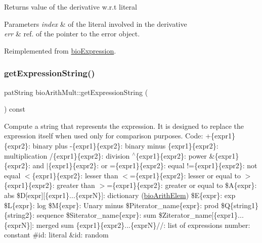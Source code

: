\begin{DoxyReturn}{Returns}
value of the derivative w.\+r.\+t literal 
\end{DoxyReturn}

\begin{DoxyParams}{Parameters}
{\em index} & of the literal involved in the derivative \\
\hline
{\em err} & ref. of the pointer to the error object. \\
\hline
\end{DoxyParams}


Reimplemented from \hyperlink{classbio_expression_a5915579d1193f25f216c1e273c97f2ce}{bio\+Expression}.

\mbox{\label{classbio_arith_mult_a7a19012c1cfe783b75de9a9c961587c2}} 
\subsubsection{\texorpdfstring{get\+Expression\+String()}{getExpressionString()}}
{\footnotesize\ttfamily pat\+String bio\+Arith\+Mult\+::get\+Expression\+String (\begin{DoxyParamCaption}{ }\end{DoxyParamCaption}) const\hspace{0.3cm}{\ttfamily [virtual]}}

Compute a string that represents the expression. It is designed to replace the expression itself when used only for comparison purposes. Code\+: +\{expr1\}\{expr2\}\+: binary plus -\/\{expr1\}\{expr2\}\+: binary minus \{expr1\}\{expr2\}\+: multiplication /\{expr1\}\{expr2\}\+: division $^\wedge$\{expr1\}\{expr2\}\+: power \&\{expr1\}\{expr2\}\+: and $\vert$\{expr1\}\{expr2\}\+: or =\{expr1\}\{expr2\}\+: equal !=\{expr1\}\{expr2\}\+: not equal $<$\{expr1\}\{expr2\}\+: lesser than $<$=\{expr1\}\{expr2\}\+: lesser or equal to $>$\{expr1\}\{expr2\}\+: greater than $>$=\{expr1\}\{expr2\}\+: greater or equal to \$A\{expr\}\+: abs \$D\mbox{[}expr\mbox{]}\mbox{[}\{expr1\}...\{exprN\}\mbox{]}\+: dictionary (\hyperlink{classbio_arith_elem}{bio\+Arith\+Elem}) \$E\{expr\}\+: exp \$L\{expr\}\+: log \$M\{expr\}\+: Unary minus \$\+Piterator\+\_\+name\{expr\}\+: prod \$Q\{string1\}\{string2\}\+: sequence \$\+Siterator\+\_\+name\{expr\}\+: sum \$\+Ziterator\+\_\+name\mbox{[}\{expr1\}...\{exprN\}\mbox{]}\+: merged sum \{expr1\}\{expr2\}...\{exprN\}//\+: list of expressions number\+: constant \#id\+: literal \&id\+: random 

